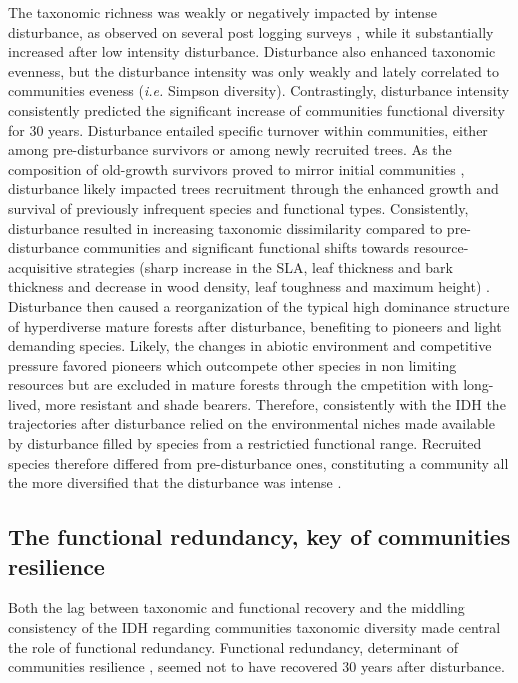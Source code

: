 \documentclass[fleqn,10pt]{ArtEcoFoG} %
\theoremstyle{definition}
\theoremstyle{definition}
\theoremstyle{definition}
\theoremstyle{remark}
\begin{document}
The taxonomic richness was weakly or negatively impacted by intense
disturbance, as observed on several post logging surveys
\citep{Cannon1998, Baraloto2012a}, while it substantially increased
after low intensity disturbance. Disturbance also enhanced taxonomic
evenness, but the disturbance intensity was only weakly and lately
correlated to communities eveness (\emph{i.e.} Simpson diversity).
Contrastingly, disturbance intensity consistently predicted the
significant increase of communities functional diversity for 30 years.
Disturbance entailed specific turnover within communities, either among
pre-disturbance survivors or among newly recruited trees. As the
composition of old-growth survivors proved to mirror initial communities
\citep{Herault2018}, disturbance likely impacted trees recruitment
through the enhanced growth and survival of previously infrequent
species and functional types. Consistently, disturbance resulted in
increasing taxonomic dissimilarity compared to pre-disturbance
communities and significant functional shifts towards
resource-acquisitive strategies (sharp increase in the SLA, leaf
thickness and bark thickness and decrease in wood density, leaf
toughness and maximum height)
\citep{Westoby1998, Wright2004, Reich2014}. Disturbance then caused a
reorganization of the typical high dominance structure of hyperdiverse
mature forests after disturbance, benefiting to pioneers and light
demanding species. Likely, the changes in abiotic environment and
competitive pressure favored pioneers which outcompete other species in
non limiting resources but are excluded in mature forests through the
cmpetition with long-lived, more resistant and shade bearers. Therefore,
consistently with the IDH the trajectories after disturbance relied on
the environmental niches made available by disturbance filled by species
from a restrictied functional range. Recruited species therefore
differed from pre-disturbance ones, constituting a community all the
more diversified that the disturbance was intense \citep{Molino2001}.

\subsection{The functional redundancy, key of communities
resilience}\label{the-functional-redundancy-key-of-communities-resilience}

Both the lag between taxonomic and functional recovery and the middling
consistency of the IDH regarding communities taxonomic diversity made
central the role of functional redundancy. Functional redundancy,
determinant of communities resilience
\citep{Trenbath1999, Elmqvist2003, Diaz2005}, seemed not to have
recovered 30 years after disturbance.
\end{document}
